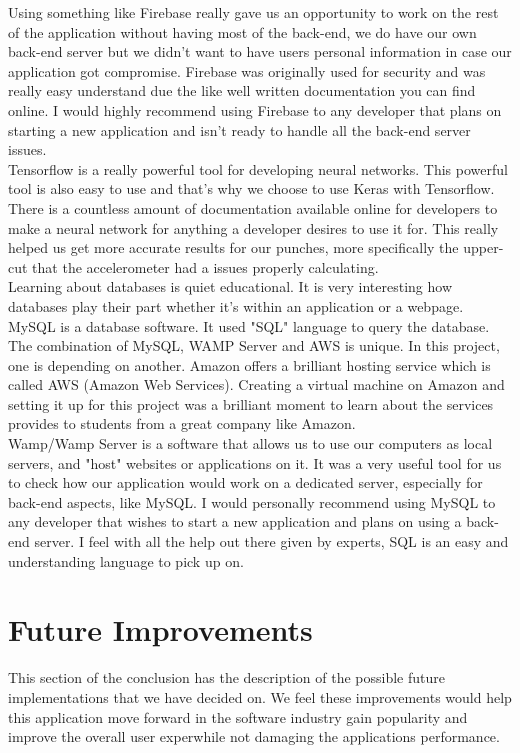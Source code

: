 \documentclass[a4paper,12pt]{report}
\begin{document}
Using something like Firebase really gave us an opportunity to work on the rest of the application without having most of the back-end, we do have our own back-end server but we didn't want to have users personal information in case our application got compromise. Firebase was originally used for security and was really easy understand due the like well written documentation you can find online. I would highly recommend using Firebase to any developer that plans on starting a new application and isn't ready to handle all the back-end server issues. \\

Tensorflow is a really powerful tool for developing neural networks. This powerful tool is also easy to use and that's why we choose to use Keras with Tensorflow. There is a countless amount of documentation available online for developers to make a neural network for anything a developer desires to use it for. This really helped us get more accurate results for our punches, more specifically the upper-cut that the accelerometer had a issues properly calculating.\\

Learning about databases is quiet educational. It is very interesting how databases play their part whether it's within an application or a webpage. MySQL is a database software. It used "SQL" language to query the database. The combination of MySQL, WAMP Server and AWS is unique. In this project, one is depending on another. Amazon offers a brilliant hosting service which is called AWS (Amazon Web Services). Creating a virtual machine on Amazon and setting it up for this project was a brilliant moment to learn about the services provides to students from a great company like Amazon.\\
Wamp/Wamp Server is a software that allows us to use our computers as local servers, and "host" websites or applications on it. It was a very useful tool for us to check how our application would work on a dedicated server, especially for back-end aspects, like MySQL.
I would personally recommend using MySQL to any developer that wishes to start a new application and plans on using a back-end server. I feel with all the help out there given by experts, SQL is an easy and understanding language to pick up on.

\section{Future Improvements}
This section of the conclusion has the description of the possible future implementations that we have decided on. We feel these improvements would help this application move forward in the software industry gain popularity and improve the overall user exper\bodyience while not damaging the applications performance.\\
\end{document}
